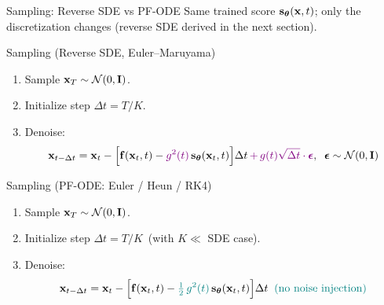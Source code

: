 \documentclass{beamer}
\begin{document}
\begin{frame}{Sampling: Reverse SDE vs PF-ODE}
	Same trained score $\mathbf{s}_{\boldsymbol{\theta}}(\mathbf{x}, t)$; only the discretization changes (reverse SDE derived in the next section).
	\eqpause
	\begin{block}{Sampling (Reverse SDE, Euler--Maruyama)}
		\begin{enumerate}
			\item Sample $\mathbf{x}_T \sim \mathcal{N}(0, \mathbf{I})$.
			\item Initialize step $\Delta t = T / K$.
			\item Denoise:
			\vspace{-0.2cm}
			\[
				\mathbf{x}_{t - \Delta t} = \mathbf{x}_t - \Bigl[\mathbf{f}(\mathbf{x}_t, t) - {\color{violet}g^2(t)}\, \mathbf{s}_{\boldsymbol{\theta}}(\mathbf{x}_t, t)\Bigr] \Delta t \, {\color{violet}+ \, g(t)\sqrt{\Delta t} \cdot \boldsymbol{\epsilon}}, \;\; \boldsymbol{\epsilon} \sim \mathcal{N}(0, \mathbf{I})
			\]
			\vspace{-0.5cm}
		\end{enumerate}
	\end{block}
	\eqpause
	\begin{block}{Sampling (PF-ODE: Euler / Heun / RK4)}
		\begin{enumerate}
			\item Sample $\mathbf{x}_T \sim \mathcal{N}(0, \mathbf{I})$.
			\item Initialize step $\Delta t = T / K$ \,(with $K \ll$ SDE case).
			\item Denoise:
			\vspace{-0.2cm}
			\[
				\mathbf{x}_{t - \Delta t} = \mathbf{x}_t - \Bigl[\mathbf{f}(\mathbf{x}_t, t) - {\color{teal}\tfrac{1}{2}\, g^2(t)}\, \mathbf{s}_{\boldsymbol{\theta}}(\mathbf{x}_t, t)\Bigr] \Delta t \;\; {\color{teal}(\text{no noise injection})}
			\]
			\vspace{-0.5cm}
		\end{enumerate}
	\end{block}
\end{frame}
\end{document}
